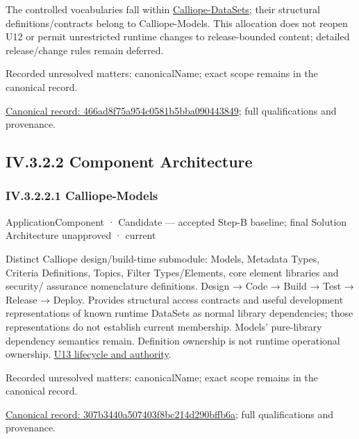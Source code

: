 The controlled vocabularies fall within \hyperref[element:466ad8f75a954c0581b5bba090443849]{Calliope-DataSets};
their structural definitions/contracts belong to Calliope-Models. This allocation
does not reopen U12 or permit unrestricted runtime changes to release-bounded
content; detailed release/change rules remain deferred.


{\small Recorded unresolved matters: canonicalName; exact scope remains in the canonical record.}\par
{\footnotesize \href{../../../../continuum/application/application-component/466ad8f75a954c0581b5bba090443849.md}{Canonical record: 466ad8f75a954c0581b5bba090443849}; full qualifications and provenance.}\par
\subsection*{IV.3.2.2 Component Architecture}
\label{navigation:IV.3.2.2}

\subsubsection*{IV.3.2.2.1 Calliope-Models}
\label{navigation:IV.3.2.2.1}

\label{element:307b3440a507403f8bc214d290bffb6a}
{\small ApplicationComponent · Candidate — accepted Step-B baseline; final Solution Architecture unapproved · current}\par

Distinct Calliope design/build-time submodule: Models, Metadata Types, Criteria
Definitions, Topics, Filter Types/Elements, core element libraries and security/
assurance nomenclature definitions. Design → Code → Build → Test → Release → Deploy.
Provides structural access contracts and useful development representations of
known runtime DataSets as normal library dependencies; those representations do
not establish current membership. Models' pure-library dependency semantics remain.
Definition ownership is not runtime operational ownership. \hyperref[element:307b3440a507403f8bc214d290bffb6a]{U13 lifecycle and authority}.


{\small Recorded unresolved matters: canonicalName; exact scope remains in the canonical record.}\par
{\footnotesize \href{../../../../continuum/application/application-component/307b3440a507403f8bc214d290bffb6a.md}{Canonical record: 307b3440a507403f8bc214d290bffb6a}; full qualifications and provenance.}\par
